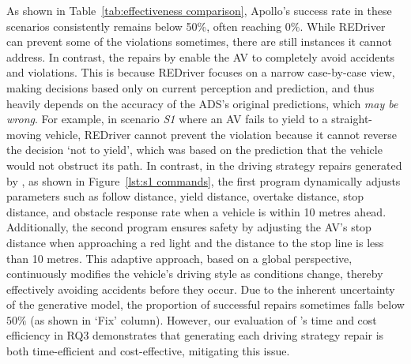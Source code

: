 As shown in Table~\ref{tab:effectiveness comparison}, Apollo's success rate in these scenarios consistently remains below 50\%, often reaching 0\%. While REDriver can prevent some of the violations sometimes, there are still instances it cannot address.
In contrast, the repairs by \coolname enable the AV to completely avoid accidents and violations.
This is because REDriver focuses on a narrow case-by-case view, making decisions based only on current perception and prediction, and thus heavily depends on the accuracy of the ADS's original predictions, which \emph{may be wrong}.
For example, in scenario \emph{S1} where an AV fails to yield to a straight-moving vehicle, REDriver cannot prevent the violation because it cannot reverse the decision `not to yield', which was based on the prediction that the vehicle would not obstruct its path. 
In contrast, in the driving strategy repairs generated by \coolname, as shown in Figure~\ref{lst:s1 commands}, the first program dynamically adjusts parameters such as follow distance, yield distance, overtake distance, stop distance, and obstacle response rate when a vehicle is within 10 metres ahead. Additionally, the second program ensures safety by adjusting the AV's stop distance when approaching a red light and the distance to the stop line is less than 10 metres. This adaptive approach, based on a global perspective, continuously modifies the vehicle's driving style as conditions change, thereby effectively avoiding accidents before they occur. 
Due to the inherent uncertainty of the generative model, the proportion of successful repairs sometimes falls below $50\%$ (as shown in `Fix' column).  However, our evaluation of \coolname's time and cost efficiency in RQ3 demonstrates that generating each driving strategy repair is both time-efficient and cost-effective, mitigating this issue.

